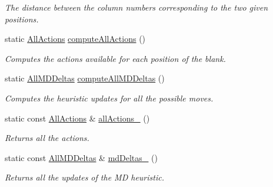 \begin{DoxyCompactItemize}
\begin{DoxyCompactList}\small\item\em The distance between the column numbers corresponding to the two given positions. \end{DoxyCompactList}\item 
static \hyperlink{structslb_1_1ext_1_1domain_1_1sliding__tile_1_1SlidingTile_a8fff8f76f90786fdf02bbf86037aeea6}{All\+Actions} \hyperlink{structslb_1_1ext_1_1domain_1_1sliding__tile_1_1SlidingTile_ad52481727fb1624f5ada2f57807c4dc9}{compute\+All\+Actions} ()\hypertarget{structslb_1_1ext_1_1domain_1_1sliding__tile_1_1SlidingTile_ad52481727fb1624f5ada2f57807c4dc9}{}\label{structslb_1_1ext_1_1domain_1_1sliding__tile_1_1SlidingTile_ad52481727fb1624f5ada2f57807c4dc9}

\begin{DoxyCompactList}\small\item\em Computes the actions available for each position of the blank. \end{DoxyCompactList}\item 
static \hyperlink{structslb_1_1ext_1_1domain_1_1sliding__tile_1_1SlidingTile_a82f77d8b64d6c82de4df1ff94b617df8}{All\+M\+D\+Deltas} \hyperlink{structslb_1_1ext_1_1domain_1_1sliding__tile_1_1SlidingTile_abf0e81ff790b1812eeb04b1cef260ad6}{compute\+All\+M\+D\+Deltas} ()
\begin{DoxyCompactList}\small\item\em Computes the heuristic updates for all the possible moves. \end{DoxyCompactList}\item 
static const \hyperlink{structslb_1_1ext_1_1domain_1_1sliding__tile_1_1SlidingTile_a8fff8f76f90786fdf02bbf86037aeea6}{All\+Actions} \& \hyperlink{structslb_1_1ext_1_1domain_1_1sliding__tile_1_1SlidingTile_a65ad693b3680bb4b8b78137054f6f35e}{all\+Actions\+\_\+} ()
\begin{DoxyCompactList}\small\item\em Returns all the actions. \end{DoxyCompactList}\item 
static const \hyperlink{structslb_1_1ext_1_1domain_1_1sliding__tile_1_1SlidingTile_a82f77d8b64d6c82de4df1ff94b617df8}{All\+M\+D\+Deltas} \& \hyperlink{structslb_1_1ext_1_1domain_1_1sliding__tile_1_1SlidingTile_a28beffc0d55344e06a839d3cd9f309c3}{md\+Deltas\+\_\+} ()\hypertarget{structslb_1_1ext_1_1domain_1_1sliding__tile_1_1SlidingTile_a28beffc0d55344e06a839d3cd9f309c3}{}\label{structslb_1_1ext_1_1domain_1_1sliding__tile_1_1SlidingTile_a28beffc0d55344e06a839d3cd9f309c3}

\begin{DoxyCompactList}\small\item\em Returns all the updates of the MD heuristic. \end{DoxyCompactList}\end{DoxyCompactItemize}
